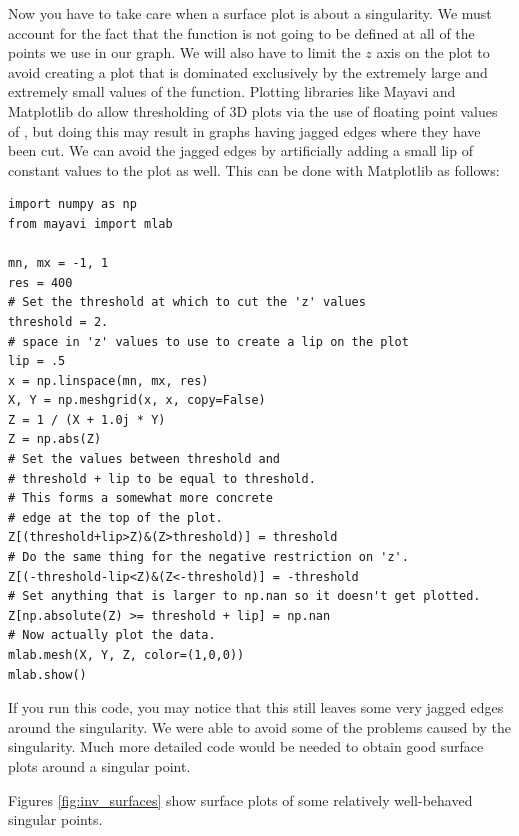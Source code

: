 Now you have to take care when a surface plot is about a singularity.  We must account for the fact that the function is not going to be defined at all of the points we use in our graph.
We will also have to limit the $z$ axis on the plot to avoid creating a plot that is dominated exclusively by the extremely large and extremely small values of the function.
Plotting libraries like Mayavi and Matplotlib do allow thresholding of 3D plots via the use of floating point values of , but doing this may result in graphs having jagged edges where they have been cut.
We can avoid the jagged edges by artificially adding a small lip of constant values to the plot as well.
This can be done with Matplotlib as follows:
\begin{lstlisting}
import numpy as np
from mayavi import mlab

mn, mx = -1, 1
res = 400
# Set the threshold at which to cut the 'z' values
threshold = 2.
# space in 'z' values to use to create a lip on the plot
lip = .5
x = np.linspace(mn, mx, res)
X, Y = np.meshgrid(x, x, copy=False)
Z = 1 / (X + 1.0j * Y)
Z = np.abs(Z)
# Set the values between threshold and
# threshold + lip to be equal to threshold.
# This forms a somewhat more concrete
# edge at the top of the plot.
Z[(threshold+lip>Z)&(Z>threshold)] = threshold
# Do the same thing for the negative restriction on 'z'.
Z[(-threshold-lip<Z)&(Z<-threshold)] = -threshold
# Set anything that is larger to np.nan so it doesn't get plotted.
Z[np.absolute(Z) >= threshold + lip] = np.nan
# Now actually plot the data.
mlab.mesh(X, Y, Z, color=(1,0,0))
mlab.show()
\end{lstlisting}
If you run this code, you may notice that this still leaves some very jagged edges around the singularity.
We were able to avoid some of the problems caused by the singularity.
Much more detailed code would be needed to obtain good surface plots around a singular point.

Figures \ref{fig:inv_surfaces} show surface plots of some relatively well-behaved singular points.

